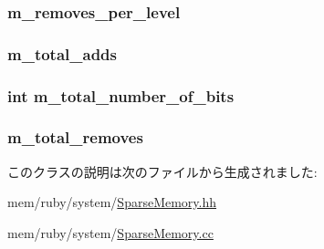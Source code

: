 \label{classSparseMemory_a29e40197e4f3ec21061a02ee9a3dd5eb}
\hypertarget{classSparseMemory_a26fd7b44dcff75112173b9672dfc21b6}{
\subsubsection[{m\_\-removes\_\-per\_\-level}]{ {\bf m\_\-removes\_\-per\_\-level}}}
\label{classSparseMemory_a26fd7b44dcff75112173b9672dfc21b6}
\hypertarget{classSparseMemory_af76a2ea16aef8c95f5f840cd1cd0990c}{
\subsubsection[{m\_\-total\_\-adds}]{ {\bf m\_\-total\_\-adds}}}
\label{classSparseMemory_af76a2ea16aef8c95f5f840cd1cd0990c}
\hypertarget{classSparseMemory_afa143dbd3f54d7d1568d199a762a2a6c}{
\subsubsection[{m\_\-total\_\-number\_\-of\_\-bits}]{\setlength{\rightskip}{0pt plus 5cm}int {\bf m\_\-total\_\-number\_\-of\_\-bits}}}
\label{classSparseMemory_afa143dbd3f54d7d1568d199a762a2a6c}
\hypertarget{classSparseMemory_a0adb1789aac47c7bc6fffcdd2f8e9df3}{
\subsubsection[{m\_\-total\_\-removes}]{ {\bf m\_\-total\_\-removes}}}
\label{classSparseMemory_a0adb1789aac47c7bc6fffcdd2f8e9df3}


このクラスの説明は次のファイルから生成されました:\begin{DoxyCompactItemize}
\item 
mem/ruby/system/\hyperlink{SparseMemory_8hh}{SparseMemory.hh}\item 
mem/ruby/system/\hyperlink{SparseMemory_8cc}{SparseMemory.cc}\end{DoxyCompactItemize}
